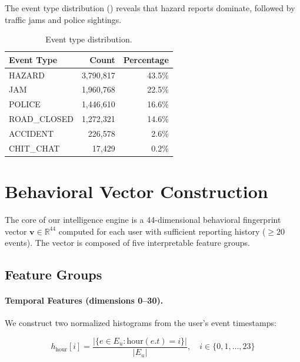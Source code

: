 \documentclass[11pt,a4paper]{article}
\begin{document}
The event type distribution () reveals that hazard reports dominate, followed by traffic jams and police sightings.

\begin{table}[ht]
\centering
\caption{Event type distribution.}
\label{tab:event_types}
\begin{tabular}{lrr}
\toprule
\textbf{Event Type} & \textbf{Count} & \textbf{Percentage} \\
\midrule
HAZARD       & 3,790,817 & 43.5\% \\
JAM          & 1,960,768 & 22.5\% \\
POLICE       & 1,446,610 & 16.6\% \\
ROAD\_CLOSED & 1,272,321 & 14.6\% \\
ACCIDENT     &   226,578 &  2.6\% \\
CHIT\_CHAT   &    17,429 &  0.2\% \\
\bottomrule
\end{tabular}
\end{table}

\section{Behavioral Vector Construction}
\label{sec:vectors}

The core of our intelligence engine is a 44-dimensional behavioral fingerprint vector $\mathbf{v} \in \mathbb{R}^{44}$ computed for each user with sufficient reporting history ($\geq 20$ events). The vector is composed of five interpretable feature groups.

\subsection{Feature Groups}

\paragraph{Temporal Features (dimensions 0--30).}
We construct two normalized histograms from the user's event timestamps:

\begin{equation}
\label{eq:hour_hist}
h_{\text{hour}}[i] = \frac{|\{e \in E_u : \text{hour}(e.t) = i\}|}{|E_u|}, \quad i \in \{0, 1, \ldots, 23\}
\end{equation}
\end{document}
